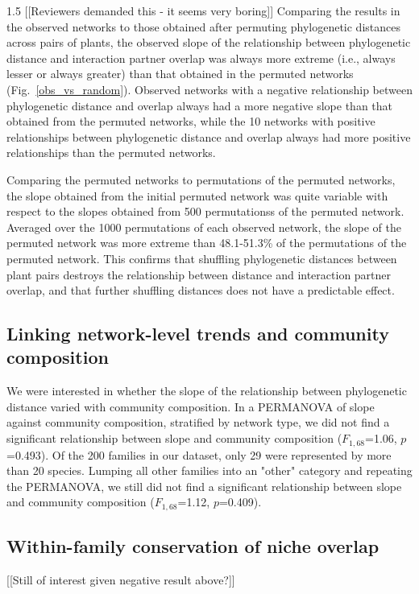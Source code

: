 \documentclass[12pt]{article}
\begin{document}
\begin{spacing}{1.5}
    [[Reviewers demanded this - it seems very boring]]
    Comparing the results in the observed networks to those obtained after permuting phylogenetic distances across pairs of plants, the observed slope of the relationship between phylogenetic distance and interaction partner overlap was always more extreme (i.e., always lesser or always greater) than that obtained in the permuted networks (Fig.~\ref{obs_vs_random}). Observed networks with a negative relationship between phylogenetic distance and overlap always had a more negative slope than that obtained from the permuted networks, while the 10 networks with positive relationships between phylogenetic distance and overlap always had more positive relationships than the permuted networks.


    Comparing the permuted networks to permutations of the permuted networks, the slope obtained from the initial permuted network was quite variable with respect to the slopes obtained from 500 permutationss of the permuted network. Averaged over the 1000 permutations of each observed network, the slope of the permuted network was more extreme than 48.1-51.3\% of the permutations of the permuted network. This confirms that shuffling phylogenetic distances between plant pairs destroys the relationship between distance and interaction partner overlap, and that further shuffling distances does not have a predictable effect.


  \subsection*{Linking network-level trends and community composition} 

    We were interested in whether the slope of the relationship between phylogenetic distance varied with community composition. In a PERMANOVA of slope against community composition, stratified by network type, we did not find a significant relationship between slope and community composition ($F_{1,68}$=1.06, $p$=0.493). Of the 200 families in our dataset, only 29 were represented by more than 20 species. Lumping all other families into an "other" category and repeating the PERMANOVA, we still did not find a significant relationship between slope and community composition ($F_{1,68}$=1.12, $p$=0.409). 


  \subsection*{Within-family conservation of niche overlap} [[Still of interest given negative result above?]]


\end{spacing}
\end{document}
